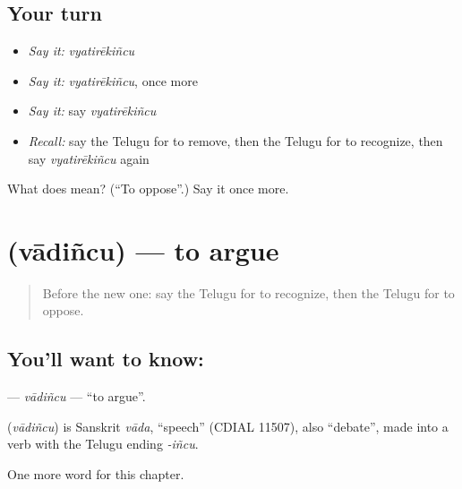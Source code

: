 \subsection*{Your turn}
\begin{itemize}
\raggedright
  \item \emph{Say it:} \emph{vyatirēkiñcu}
  \item \emph{Say it:} \emph{vyatirēkiñcu}, once more
  \item \emph{Say it:} say \emph{vyatirēkiñcu}
  \item \emph{Recall:} say the Telugu for to remove, then the Telugu for to recognize, then say \emph{vyatirēkiñcu} again
\end{itemize}

\begin{tcolorbox}[breakable,colback=teal!4,colframe=teal!35!black,title={Before you move on}]
What does  mean? (\textquotedblleft{}To oppose\textquotedblright{}.) Say it once more.
\end{tcolorbox}
\section[\texorpdfstring{\te{వాదించు} (vādiñcu)}{వాదించు (vādiñcu)}]{ (vādiñcu) — to argue}

\label{lesson:TE-C283-vadincu}



\begin{quote}
Before the new one: say the Telugu for to recognize, then the Telugu for to oppose.
\end{quote}

\subsection*{You'll want to know: }
\textbf{} — \emph{vādiñcu} — \textquotedblleft{}to argue\textquotedblright{}.

\begin{cousinweb}
\textbf{} (\emph{vādiñcu}) is Sanskrit \emph{vāda}, \textquotedblleft{}speech\textquotedblright{} (CDIAL 11507), also \textquotedblleft{}debate\textquotedblright{}, made into a verb with the Telugu ending \emph{-iñcu}.
\end{cousinweb}

\begin{grammarlens}[title={What you've built}]
One more word for this chapter.
\end{grammarlens}

